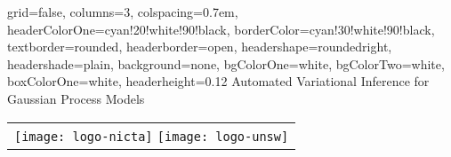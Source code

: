 \documentclass[landscape,a0paper,fontscale=0.292]{baposter}
\begin{document}
\begin{poster}{
 grid=false,
 columns=3,
 colspacing=0.7em,
 headerColorOne=cyan!20!white!90!black,
 borderColor=cyan!30!white!90!black,
textborder=rounded,
 headerborder=open,
 headershape=roundedright,
 headershade=plain,
 background=none,
  bgColorOne=white,
  bgColorTwo=white,
  boxColorOne=white,
 headerheight=0.12\textheight}
 {
 }
 {
 \sc  
	Automated Variational Inference for Gaussian Process Models
 }
  { 
   \vspace{5mm} 
 }
 {
   \begin{tabular}{c}
   \centering
      \texttt{[image: logo-nicta]} \hspace{5mm}
     \texttt{[image: logo-unsw]}
   \end{tabular}
 }





\end{poster}
\end{document}
